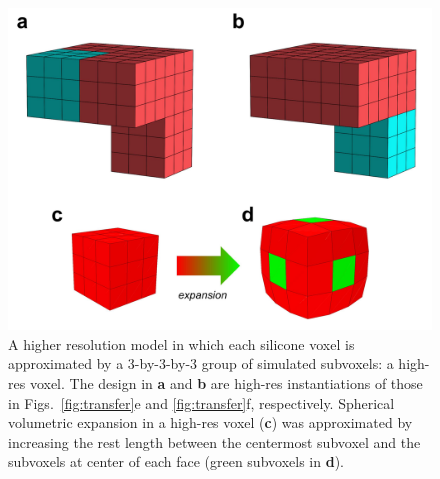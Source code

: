 
\begin{figure}[t]
    \centering
    \includegraphics[width=0.65\linewidth]{Chapter02/fig/Yale_High_Res_Sim.jpg}
    \caption{A higher resolution model in which each silicone voxel is approximated by a 3-by-3-by-3 group of simulated subvoxels: a high-res voxel.
    The design in \textbf{a} and \textbf{b} are high-res instantiations of those in Figs.~\ref{fig:transfer}e and \ref{fig:transfer}f, respectively. 
    Spherical volumetric expansion in a high-res voxel (\textbf{c}) was approximated by increasing the rest length between the centermost subvoxel and the subvoxels at center of each face (green subvoxels in \textbf{d}).
    }
    \label{fig:hi_res_sim}
\end{figure}
